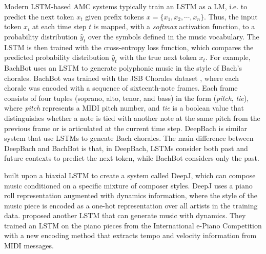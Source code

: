 Modern LSTM-based AMC systems typically train an LSTM as a LM, i.e. to predict the next token $x_{t}$ given prefix tokens $x = \{x_1, x_2, \cdots, x_n\}$. Thus, the input token $x_t$ at each time step $t$ is mapped, with a \textit{softmax} activation function, to a probability distribution $\hat{y}_t$ over the symbols defined in the music vocabulary. The LSTM is then trained with the cross-entropy loss function, which compares the predicted probability distribution $\hat{y}_t$ with the true next token $x_t$. For example, BachBot \cite{liang2017automatic} uses an LSTM to generate polyphonic music in the style of Bach's chorales. BachBot was trained with the JSB Chorales dataset \cite{boulanger2012modeling}, where each chorale was encoded with a sequence of sixteenth-note frames. Each frame consists of four tuples (soprano, alto, tenor, and bass) in the form (\textit{pitch}, \textit{tie}), where \textit{pitch} represents a MIDI pitch number, and \textit{tie} is a boolean value that distinguishes whether a note is tied with another note at the same pitch from the previous frame or is articulated at the current time step. DeepBach \cite{hadjeres2017deepbach} is similar system that use LSTMs to geneate Bach chorales. The main difference between DeepBach and BachBot is that, in DeepBach, LSTMs consider both past and future contexts to predict the next token, while BachBot considers only the past.


\citet{Mao_2018} built upon a biaxial LSTM \cite{johnson2017generating} to create a system called DeepJ, which can compose music conditioned on a specific mixture of composer styles. DeepJ uses a piano roll representation augmented with dynamics information, where the style of the music piece is encoded as a one-hot representation over all artists in the training data. \citet{oore2017learning} proposed another LSTM that can generate music with dynamics. They trained an LSTM on the piano pieces from the International e-Piano Competition \cite{yamahaEPiano} with a new encoding method that extracts tempo and velocity information from MIDI messages.

